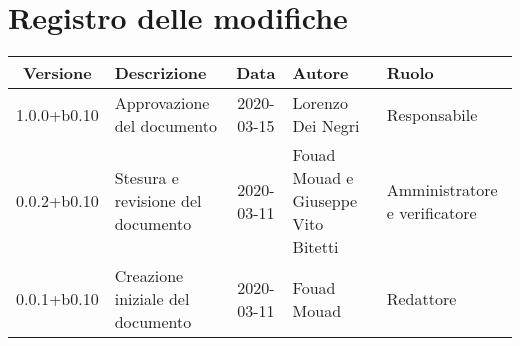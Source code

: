 \section*{Registro delle modifiche}

\begin{center}
	\begin{longtable}{|c|p{3.5cm}|c|p{3cm}|p{3cm}|}
	\hline
	\rowcolor{lighter-grayer}
	\textbf{Versione} & \textbf{Descrizione} & \textbf{Data} & \textbf{Autore} & \textbf{Ruolo} \\
	\hline
	\endfirsthead

	1.0.0+b0.10 & Approvazione del documento & 2020-03-15 & Lorenzo Dei Negri & Responsabile \\
	\hline
	0.0.2+b0.10 & Stesura e revisione del documento & 2020-03-11 & Fouad Mouad e Giuseppe Vito Bitetti & Amministratore e verificatore \\
	\hline
	0.0.1+b0.10 & Creazione iniziale del documento & 2020-03-11 & Fouad Mouad & Redattore \\
	\hline

	\end{longtable}
\end{center}